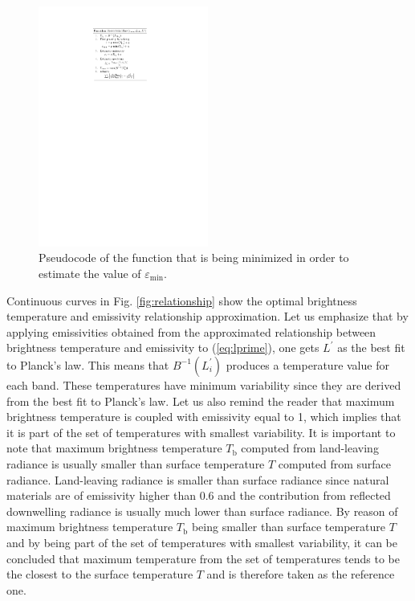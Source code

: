 \begin{figure}[!t]
\centering
\includegraphics[width=2.2in]{pics/Chapter_03/pseudo_code.pdf}
\vspace{1.5 em}
\caption{Pseudocode of the function that is being minimized in order to estimate the value of $\varepsilon_\mathrm{min}$.}
\label{fig:FunctionCode}
\end{figure}

Continuous curves in Fig. \ref{fig:relationship} show the optimal brightness temperature and emissivity relationship approximation.  {
Let us emphasize that by applying emissivities obtained from the approximated relationship between brightness temperature and emissivity to (\ref{eq:lprime}), one gets $L^\prime$ as the best fit to Planck's law. This means that $B^{-1}(L^\prime_i)$ produces a temperature value for each band. These temperatures have minimum variability since they are derived from the best fit to Planck's law. Let us also remind the reader that maximum brightness temperature is coupled with emissivity equal to 1, which implies that it is part of the set of temperatures with smallest variability. It is important to note that maximum brightness temperature $T_\mathrm{b}$ computed from land-leaving radiance is usually smaller than surface temperature $T$ computed from surface radiance. Land-leaving radiance is smaller than surface radiance since natural materials are of emissivity higher than $0.6$ and the contribution from reflected downwelling radiance is usually much lower than surface radiance. By reason of maximum brightness temperature $T_\mathrm{b}$ being smaller than surface temperature $T$ and by being part of the set of temperatures with smallest variability, it can be concluded that maximum temperature from the set of temperatures tends to be the closest to the surface temperature $T$ and is therefore taken as the reference one.}

